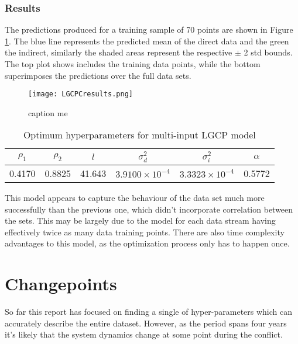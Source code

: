\documentclass[a4paper,11pt]{report}
\begin{document}
\subsection{Results}
The predictions produced for a training sample of 70 points are shown in Figure \ref{fig:LGCPCresults}. The blue line represents the predicted mean of the direct data and the green the indirect, similarly the shaded areas represent the respective \(\pm\) 2 std bounds. The top plot shows includes the training data points, while the bottom superimposes the predictions over the full data sets. \par

\begin{figure}
\centering
\texttt{[image: LGCPCresults.png]}
\caption{caption me}
\label{fig:LGCPCresults}
\end{figure}

\begin{table}[]
\centering
\caption{Optimum hyperparameters for multi-input LGCP model}
\label{LGCPChyper}
\begin{tabular}{|c|c|c|c|c|c|}
\hline
\multicolumn{1}{|c|}{\(\rho_1\)} & \multicolumn{1}{c|}{\(\rho_2\)} & \(l\)                      & \(\sigma_d^2\)            & \(\sigma_i^2\)            & \(\alpha\) \\ \hline
0.4170                            & 0.8825                           & \multicolumn{1}{c|}{41.643} & \(3.9100 \times 10^{-4}\) & \(3.3323 \times 10^{-4}\) & 0.5772     \\ \hline
\end{tabular}
\end{table}

This model appears to capture the behaviour of the data set much more successfully than the previous one, which didn't incorporate correlation between the sets. This may be largely due to the model for each data stream having effectively twice as many data training points. There are also time complexity advantages to this model, as the optimization process only has to happen once.


\chapter{Changepoints}

So far this report has focused on finding a single of hyper-parameters which can accurately describe the entire dataset. However, as the period spans four years it's likely that the system dynamics change at some point during the conflict.
\end{document}
